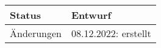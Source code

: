 \begin{table}[H]
\begin{tabularx}{\textwidth}{| l | X |}
        \hline
        Status          & Entwurf                                                                                                                                                                                                                                                                                                                           \\
        \hline
        Änderungen      & 08.12.2022: erstellt                                                                                                                                                                                                                                                                                                              \\
        \hline
    \end{tabularx}
\end{table}